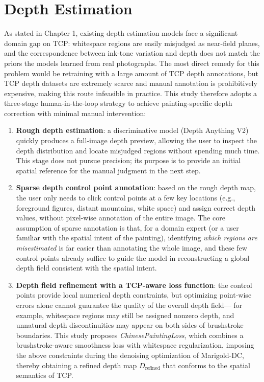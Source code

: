 \section{Depth Estimation}
\label{sec:depth}

\hspace{24pt}

As stated in Chapter 1, existing depth estimation models face a significant domain gap on TCP:
whitespace regions are easily misjudged as near-field planes,
and the correspondence between ink-tone variation and depth does not match the priors the models learned from real photographs.
The most direct remedy for this problem would be retraining with a large amount of TCP depth annotations,
but TCP depth datasets are extremely scarce and manual annotation is prohibitively expensive, making this route infeasible in practice.
This study therefore adopts a three-stage human-in-the-loop strategy
to achieve painting-specific depth correction with minimal manual intervention:

\begin{enumerate}
  \item \textbf{Rough depth estimation}:
        a discriminative model (Depth Anything V2) \cite{depthanythingv2} quickly produces a full-image depth preview,
        allowing the user to inspect the depth distribution and locate misjudged regions without spending much time.
        This stage does not pursue precision; its purpose is to provide an initial spatial reference for the manual judgment in the next step.

  \item \textbf{Sparse depth control point annotation}:
        based on the rough depth map, the user only needs to click control points at a few key locations
        (e.g., foreground figures, distant mountains, white space) and assign correct depth values,
        without pixel-wise annotation of the entire image.
        The core assumption of sparse annotation is that, for a domain expert (or a user familiar with the spatial intent of the painting),
        identifying \textit{which regions are misestimated} is far easier than annotating the whole image,
        and these few control points already suffice to guide the model in reconstructing a global depth field consistent with the spatial intent.

  \item \textbf{Depth field refinement with a TCP-aware loss function}:
        the control points provide local numerical depth constraints,
        but optimizing point-wise errors alone cannot guarantee the quality of the overall depth field---
        for example, whitespace regions may still be assigned nonzero depth,
        and unnatural depth discontinuities may appear on both sides of brushstroke boundaries.
        This study proposes \textit{ChinesePaintingLoss},
        which combines a brushstroke-aware smoothness loss with whitespace regularization,
        imposing the above constraints during the denoising optimization of Marigold-DC,
        thereby obtaining a refined depth map $D_{\mathrm{refined}}$ that conforms to the spatial semantics of TCP.
\end{enumerate}

